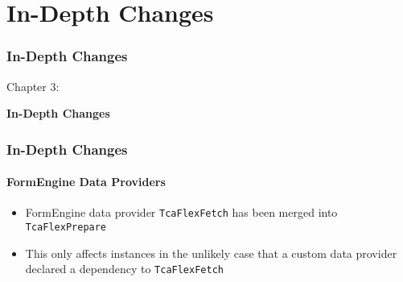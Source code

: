%

\section{In-Depth Changes}
\begin{frame}[fragile]
	\frametitle{In-Depth Changes}

	\begin{center}\huge{Chapter 3:}\end{center}
	\begin{center}\huge{\color{typo3darkgrey}\textbf{In-Depth Changes}}\end{center}

\end{frame}


\begin{frame}[fragile]
	\frametitle{In-Depth Changes}
	\framesubtitle{FormEngine Data Providers}

	\begin{itemize}
		\item FormEngine data provider \texttt{TcaFlexFetch} has been merged into \texttt{TcaFlexPrepare}
		\item This only affects instances in the unlikely case that a custom data provider declared a
			dependency to \texttt{TcaFlexFetch}
	\end{itemize}

\end{frame}

